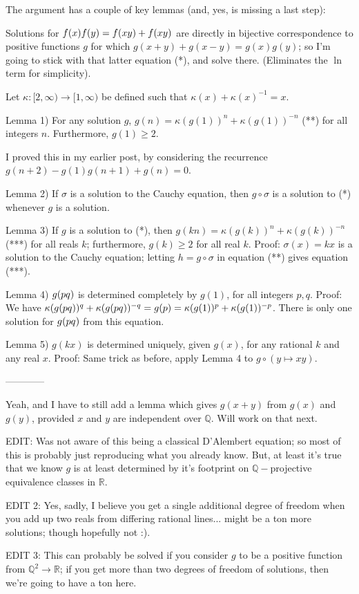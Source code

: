 \begin{solution}
	The argument has a couple of key lemmas (and, yes, is missing a last step):

Solutions for $ f(x)f(y) = f(xy) + f(x\/y)$ are directly in bijective correspondence to positive functions $ g$ for which $ g(x + y) + g(x - y) = g(x)g(y)$; so I'm
going to stick with that latter equation (*), and solve there. (Eliminates the $ \ln$ term for simplicity).

Let $ \kappa : [2,\infty) \to [1,\infty)$ be defined such that $ \kappa(x) + \kappa(x)^{ - 1} = x$.

Lemma 1) For any solution $ g$, $ g(n) = \kappa(g(1))^n + \kappa(g(1))^{ - n}$ (**) for all integers $ n$. Furthermore, $ g(1) \ge 2$.

I proved this in my earlier post, by considering the recurrence $ g(n + 2) - g(1)g(n + 1) + g(n) = 0$.
 
Lemma 2) If $ \sigma$ is a solution to the Cauchy equation, then $ g \circ \sigma$ is a solution to (*) whenever $ g$ is a solution.

Lemma 3) If $ g$ is a solution to (*), then $ g(kn) = \kappa(g(k))^n + \kappa(g(k))^{ - n}$ (***) for all reals $ k$; furthermore, $ g(k) \ge 2$ for all real $ k$.
Proof: $ \sigma(x) = kx$ is a solution to the Cauchy equation; letting $ h = g \circ \sigma$ in equation (**) gives equation (***).

Lemma 4) $ g(p\/q)$ is determined completely by $ g(1)$, for all integers $ p,q$.
Proof: We have $ \kappa(g(p\/q))^q + \kappa(g(p\/q))^{ - q} = g(p) = \kappa(g(1))^p + \kappa(g(1))^{ - p}$. There is only one solution for $ g(p\/q)$ from this 
equation.

Lemma 5) $ g(kx)$ is determined uniquely, given $ g(x)$, for any rational $ k$ and any real $ x$.
Proof: Same trick as before, apply Lemma 4 to $ g \circ (y \mapsto xy)$.

------------

Yeah, and I have to still add a lemma which gives $ g(x + y)$ from $ g(x)$ and $ g(y)$, provided $ x$ and $ y$ are independent over $ \mathbb{Q}$. Will 
work on that next.

EDIT: Was not aware of this being a classical D'Alembert equation; so most of this is probably just reproducing what you already know. But, at least
it's true that we know $ g$ is at least determined by it's footprint on $ \mathbb{Q} -$projective equivalence classes in $ \mathbb{R}$.

EDIT 2: Yes, sadly, I believe you get a single additional degree of freedom when you add up two reals from differing rational lines... might be a 
ton more solutions; though hopefully not :).

EDIT 3: This can probably be solved if you consider $ g$ to be a positive function from $ \mathbb{Q}^2 \to \mathbb{R}$; if you get more than two degrees of freedom of solutions, then we're going to have a ton here.
\end{solution}



